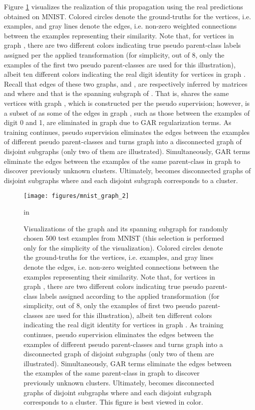 \documentclass{article} \usepackage{iclr2018_conference,times}
\begin{document}
Figure \ref{fig:pseudo_img_graph} visualizes the realization of this propagation using the real predictions obtained on MNIST. Colored circles denote the ground-truths for the vertices, i.e. examples, and gray lines denote the edges, i.e. non-zero weighted connections between the examples representing their similarity. Note that, for vertices in graph , there are two different colors indicating true pseudo parent-class labels assigned per the applied transformation (for simplicity, out of 8, only the examples of the first two pseudo parent-classes are used for this illustration), albeit ten different colors indicating the real digit identity for vertices in graph . Recall that edges of these two graphs,  and , are respectively inferred by matrices  and  where  and that  is the spanning subgraph of . That is,  shares the same vertices  with graph , which is constructed per the pseudo supervision; however,  is a subset of  as some of the edges in graph , such as those between the examples of digit 0 and 1, are eliminated in graph  due to GAR regularization terms. As training continues, pseudo supervision eliminates the edges between the examples of different pseudo parent-classes and turns graph  into a disconnected graph of  disjoint subgraphs (only two of them are illustrated). Simultaneously, GAR terms eliminate the edges between the examples of the same parent-class in graph  to discover previously unknown clusters. Ultimately,  becomes disconnected graphs of  disjoint subgraphs where  and each disjoint subgraph corresponds to a cluster. 
\begin{figure}[h]
	\begin{center}
		\centerline{\texttt{[image: figures/mnist\_graph\_2]}}
		\caption{Visualizations of the graph  and its spanning subgraph  for randomly chosen 500 test examples from MNIST (this selection is performed only for the simplicity of the visualization). Colored circles denote the ground-truths for the vertices, i.e. examples, and gray lines denote the edges, i.e. non-zero weighted connections between the examples representing their similarity. Note that, for vertices in graph , there are two different colors indicating true pseudo parent-class labels assigned according to the applied transformation (for simplicity, out of 8, only the examples of first two pseudo parent-classes are used for this illustration), albeit ten different colors indicating the real digit identity for vertices in graph . As training continues, pseudo supervision eliminates the edges between the examples of different pseudo parent-classes and turns graph  into a disconnected graph of  disjoint subgraphs (only two of them are illustrated). Simultaneously, GAR terms eliminate the edges between the examples of the same parent-class in graph  to discover previously unknown clusters. Ultimately,  becomes disconnected graphs of  disjoint subgraphs where  and each disjoint subgraph corresponds to a cluster. This figure is best viewed in color.}
	\label{fig:pseudo_img_graph}
	\end{center}
	 in
\end{figure}
\end{document}
